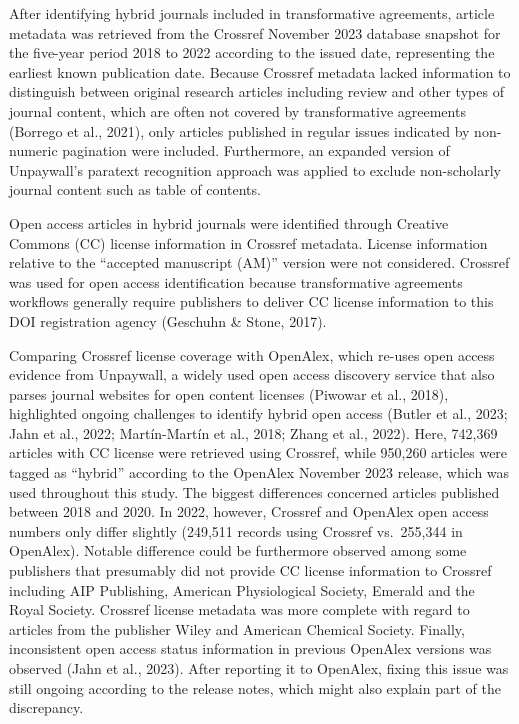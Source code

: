 \documentclass[a4paper,man,floatsintext,longtable,noextraspace,12pt]{apa6}
\begin{document}
After identifying hybrid journals included in transformative agreements,
article metadata was retrieved from the Crossref November 2023 database
snapshot for the five-year period 2018 to 2022 according to the issued
date, representing the earliest known publication date. Because Crossref
metadata lacked information to distinguish between original research
articles including review and other types of journal content, which are
often not covered by transformative agreements (Borrego et al., 2021),
only articles published in regular issues indicated by non-numeric
pagination were included. Furthermore, an expanded version of
Unpaywall's paratext recognition approach was applied to exclude
non-scholarly journal content such as table of contents.

Open access articles in hybrid journals were identified through Creative
Commons (CC) license information in Crossref metadata. License
information relative to the ``accepted manuscript (AM)'' version were
not considered. Crossref was used for open access identification because
transformative agreements workflows generally require publishers to
deliver CC license information to this DOI registration agency (Geschuhn
\& Stone, 2017).

Comparing Crossref license coverage with OpenAlex, which re-uses open
access evidence from Unpaywall, a widely used open access discovery
service that also parses journal websites for open content licenses
(Piwowar et al., 2018), highlighted ongoing challenges to identify
hybrid open access (Butler et al., 2023; Jahn et al., 2022;
Martín-Martín et al., 2018; Zhang et al., 2022). Here, 742,369 articles
with CC license were retrieved using Crossref, while 950,260 articles
were tagged as ``hybrid'' according to the OpenAlex November 2023
release, which was used throughout this study. The biggest differences
concerned articles published between 2018 and 2020. In 2022, however,
Crossref and OpenAlex open access numbers only differ slightly (249,511
records using Crossref vs.~255,344 in OpenAlex). Notable difference
could be furthermore observed among some publishers that presumably did
not provide CC license information to Crossref including AIP Publishing,
American Physiological Society, Emerald and the Royal Society. Crossref
license metadata was more complete with regard to articles from the
publisher Wiley and American Chemical Society. Finally, inconsistent
open access status information in previous OpenAlex versions was
observed (Jahn et al., 2023). After reporting it to OpenAlex, fixing
this issue was still ongoing according to the release notes, which might
also explain part of the discrepancy.
\end{document}
